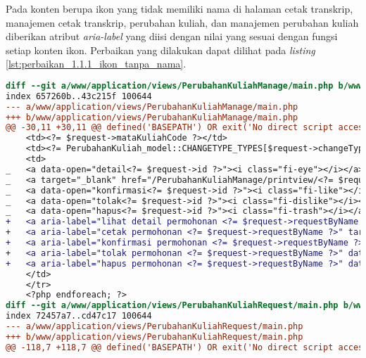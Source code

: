 Pada konten berupa ikon yang tidak memiliki nama di halaman cetak transkrip, manajemen cetak transkrip, perubahan kuliah, dan manajemen perubahan kuliah diberikan atribut \textit{aria-label} yang diisi dengan nilai yang sesuai dengan fungsi setiap konten ikon. Perbaikan yang dilakukan dapat dilihat pada \textit{listing} \ref{lst:perbaikan_1.1.1_ikon_tanpa_nama}.
\begin{lstlisting}[frame=single, label={lst:perbaikan_1.1.1_ikon_tanpa_nama}, language=diff, caption=Perbaikan Kriteria Sukses 1.1.1]
diff --git a/www/application/views/PerubahanKuliahManage/main.php b/www/application/views/PerubahanKuliahManage/main.php
index 657260b..43c215f 100644
--- a/www/application/views/PerubahanKuliahManage/main.php
+++ b/www/application/views/PerubahanKuliahManage/main.php
@@ -30,11 +30,11 @@ defined('BASEPATH') OR exit('No direct script access allowed');
    <td><?= $request->mataKuliahCode ?></td>
    <td><?= PerubahanKuliah_model::CHANGETYPE_TYPES[$request->changeType] ?></td>
    <td>
_   <a data-open="detail<?= $request->id ?>"><i class="fi-eye"></i></a>
_   <a target="_blank" href="/PerubahanKuliahManage/printview/<?= $request->id ?>"><i class="fi-print"></i></a>
_   <a data-open="konfirmasi<?= $request->id ?>"><i class="fi-like"></i></a>                                    
_   <a data-open="tolak<?= $request->id ?>"><i class="fi-dislike"></i></a>
_   <a data-open="hapus<?= $request->id ?>"><i class="fi-trash"></i></a>
+   <a aria-label="lihat detail permohonan <?= $request->requestByName ?>" data-open="detail<?= $request->id ?>"><i class="fi-eye"></i></a>
+   <a aria-label="cetak permohonan <?= $request->requestByName ?>" target="_blank" href="/PerubahanKuliahManage/printview/<?= $request->id ?>"><i class="fi-print"></i></a>
+   <a aria-label="konfirmasi permohonan <?= $request->requestByName ?>" data-open="konfirmasi<?= $request->id ?>"><i class="fi-like"></i></a>
+   <a aria-label="tolak permohonan <?= $request->requestByName ?>" data-open="tolak<?= $request->id ?>"><i class="fi-dislike"></i></a>
+   <a aria-label="hapus permohonan <?= $request->requestByName ?>" data-open="hapus<?= $request->id ?>"><i class="fi-trash"></i></a>
    </td>
    </tr>
    <?php endforeach; ?>
diff --git a/www/application/views/PerubahanKuliahRequest/main.php b/www/application/views/PerubahanKuliahRequest/main.php
index 72457a7..cd47c17 100644
--- a/www/application/views/PerubahanKuliahRequest/main.php
+++ b/www/application/views/PerubahanKuliahRequest/main.php
@@ -118,7 +118,7 @@ defined('BASEPATH') OR exit('No direct script access allowed');

\end{lstlisting}
